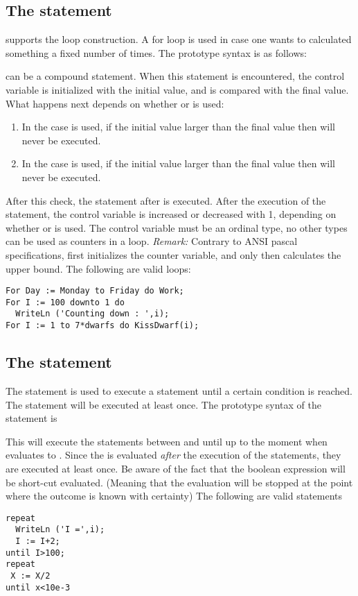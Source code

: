 \documentclass{report}
\begin{document}
\subsection{The  statement}
\fpc supports the  loop construction. A for loop is used in case
one wants to calculated something a fixed number of times.
The prototype syntax is as follows:

 can be a compound statement.
When this statement is encountered, the control variable is initialized with
the initial value, and is compared with the final value.
What happens next depends on whether  or  is used:
\begin{enumerate}
\item In the case  is used, if the initial value larger than the final
value then  will never be executed.
\item In the case  is used, if the initial value larger than the final
value then  will never be executed.
\end{enumerate}
After this check, the statement after  is executed. After the
execution of the statement, the control variable is increased or decreased
with 1, depending on whether  or  is used.
The control variable must be an ordinal type, no other
types can be used as counters in a loop.
{\em Remark:} Contrary to ANSI pascal specifications, \fpc first initializes
the counter variable, and only then calculates the upper bound.
The following are valid loops:
\begin{verbatim}
For Day := Monday to Friday do Work;
For I := 100 downto 1 do
  WriteLn ('Counting down : ',i);
For I := 1 to 7*dwarfs do KissDwarf(i);
\end{verbatim}
\subsection{The  statement}
The  statement is used to execute a statement until a certain
condition is reached. The statement will be executed at least once.
The prototype syntax of the  statement is

This will execute the statements between  and {until} up to
the moment when  evaluates to .
Since the  is evaluated {\em after} the execution of the
statements, they are executed at least once.
Be aware of the fact that the boolean expression  will be
short-cut evaluated. (Meaning that the evaluation will be stopped at the
point where the outcome is known with certainty)
The following are valid  statements
\begin{verbatim}
repeat
  WriteLn ('I =',i);
  I := I+2;
until I>100;
repeat
 X := X/2
until x<10e-3
\end{verbatim}
\end{document}
